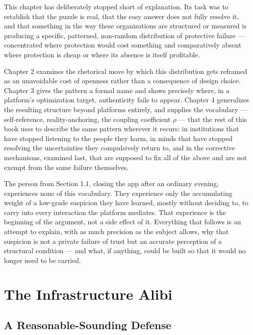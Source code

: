 \documentclass[12pt,a4paper]{book}
\begin{document}
This chapter has deliberately stopped short of explanation. Its task was to establish that the puzzle is real, that the easy answer does not fully resolve it, and that something in the way these organizations are structured or measured is producing a specific, patterned, non-random distribution of protective failure — concentrated where protection would cost something and comparatively absent where protection is cheap or where its absence is itself profitable.

Chapter 2 examines the rhetorical move by which this distribution gets reframed as an unavoidable cost of openness rather than a consequence of design choice. Chapter 3 gives the pattern a formal name and shows precisely where, in a platform's optimization target, authenticity fails to appear. Chapter 4 generalizes the resulting structure beyond platforms entirely, and supplies the vocabulary — self-reference, reality-anchoring, the coupling coefficient $\rho$ — that the rest of this book uses to describe the same pattern wherever it recurs: in institutions that have stopped listening to the people they harm, in minds that have stopped resolving the uncertainties they compulsively return to, and in the corrective mechanisms, examined last, that are supposed to fix all of the above and are not exempt from the same failure themselves.

The person from Section 1.1, closing the app after an ordinary evening, experiences none of this vocabulary. They experience only the accumulating weight of a low-grade suspicion they have learned, mostly without deciding to, to carry into every interaction the platform mediates. That experience is the beginning of the argument, not a side effect of it. Everything that follows is an attempt to explain, with as much precision as the subject allows, why that suspicion is not a private failure of trust but an accurate perception of a structural condition — and what, if anything, could be built so that it would no longer need to be carried.


\chapter{The Infrastructure Alibi}

\section{A Reasonable-Sounding Defense}
\end{document}
